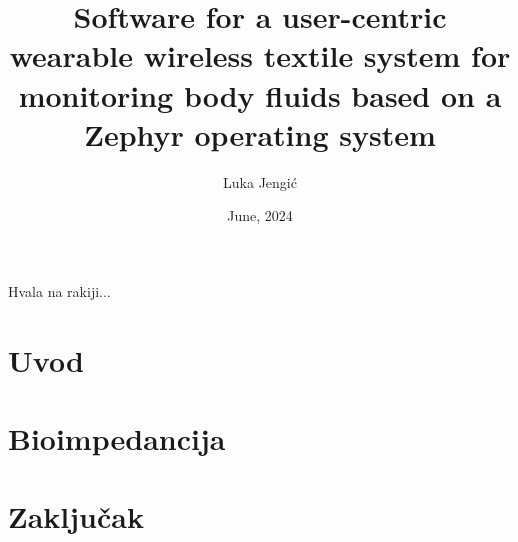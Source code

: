\documentclass[diplomskirad]{fer}
\title{Software for a user-centric wearable wireless textile system for monitoring body fluids based on a Zephyr operating system}
\author{Luka Jengić}
\date{June, 2024}
\begin{document}
\maketitle






\begin{zahvale}
  Hvala na rakiji...
\end{zahvale}


\mainmatter


\tableofcontents


\chapter{Uvod}
\label{pog:uvod}



\chapter{Bioimpedancija}
\label{pog:glavni_dio}



\chapter{Zaključak}
\label{pog:zakljucak}




\end{document}
